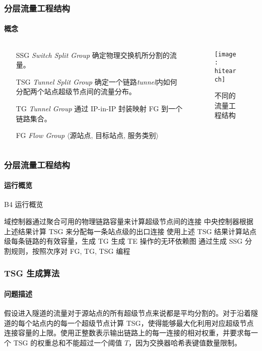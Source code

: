     \begin{frame}
        \frametitle{分层流量工程结构}
        \framesubtitle{概念}
        \begin{columns}
            \begin{column}{0.6\textwidth}
                \begin{itemize}
                    \item[SSG] \emph{Switch Split Group} 确定物理交换机所分割的流量。
                    \item[TSG] \emph{Tunnel Split Group} 确定一个链路\emph{tunnel}内如何分配两个站点超级节点间的流量分布。
                    \item[TG] \emph{Tunnel Group} 通过 IP-in-IP 封装映射 FG 到一个链路集合。 
                    \item[FG] \emph{Flow Group} $\langle$源站点, 目标站点, 服务类别$\rangle$ 
                \end{itemize}
            \end{column}
            \begin{column}{0.4\textwidth}
                \begin{figure}
                    \centering
                    \texttt{[image: hitearch]}
                    \caption{不同的流量工程结构}
                \end{figure}
            \end{column}
        \end{columns}
    \end{frame}

    \begin{frame}
        \frametitle{分层流量工程结构}
        \framesubtitle{运行概览}
        \begin{algorithm}[H]
            \caption{B4 运行概览}
            域控制器通过聚合可用的物理链路容量来计算超级节点间的连接\;
            中央控制器根据上述结果计算 TSG 来分配每一条站点级的出口连接\;
            使用上述 TSG 结果计算站点级每条链路的有效容量，生成 TG\;
            生成 TE 操作的无环依赖图\;
            通过生成 SSG 分割规则，按照次序对 FG, TG, TSG 编程\;
        \end{algorithm}
    \end{frame}

    \begin{frame}
        \frametitle{TSG 生成算法}
        \framesubtitle{问题描述}
        假设进入隧道的流量对于源站点的所有超级节点来说都是平均分割的。对于沿着隧道的每个站点内的每一个超级节点计算 TSG，使得能够最大化利用对应超级节点连接容量的上限。使用正整数表示输出链路上的每一连接的相对权重，并要求每一个 TSG 的权重总和不能超过一个阈值 $T$，因为交换器哈希表键值数量限制。
    \end{frame}

